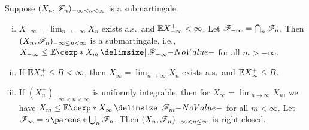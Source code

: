 \documentclass[12pt]{article}
\begin{document}
\begin{Theorem}\label{wk15:Submartingale_Convergence}
Suppose $(X_n,\mathscr{F}_n)_{-\infty<n<\infty}$ is a submartingale.
\begin{enumerate}[(i)]
	\item\label{wk15:-inftyconv} $X_{-\infty} = \lim_{n\to-\infty} X_n$ exists a.s.\ and $\E X_{-\infty}^+ < \infty$. Let $\mathscr{F}_{-\infty}=\bigcap_n \mathscr{F}_n$. Then $(X_n,\mathscr{F}_n)_{-\infty\leq n<\infty}$ is a submartingale, i.e., $X_{-\infty} \leq \E[ X_m \given \scF_{-\infty}]$ for all $m>-\infty$. 
	\item\label{wk15:inftyconv} If $\E X_n^+ \leq B <\infty$, then $X_\infty = \lim_{n\to\infty} X_n$ exists a.s.\ and $\E X_\infty^+ \leq B$. 
	\item\label{wk15:ui} If $(X_n^+)_{-\infty<n<\infty}$ is uniformly integrable, then for $X_\infty=\lim_{n\to\infty} X_n$, we have $X_m \leq \E[ X_{\infty} \given \scF_m]$ for all $m < \infty$. Let $\scF_\infty = \sigma\parens*{\bigcup_n \scF_n}$. Then $(X_n,\mathscr{F}_n)_{-\infty<n\leq\infty}$ is right-closed.
\end{enumerate}
\end{Theorem}
\end{document}
